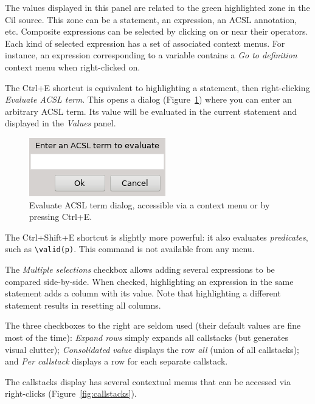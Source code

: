 The values displayed in this panel are related to the green highlighted
zone in the Cil source. This zone can be a statement, an expression,
an ACSL annotation, etc. Composite expressions can be selected by clicking
on or near their operators. Each kind of selected expression has a set
of associated context menus. For instance, an expression corresponding
to a variable contains a \emph{Go to definition} context menu when
right-clicked on.

The Ctrl+E shortcut is equivalent to highlighting a statement, then
right-clicking \emph{Evaluate ACSL term}. This opens a dialog
(Figure~\ref{fig:eval-acsl}) where you can enter an arbitrary ACSL
term. Its value will be evaluated in the current statement and
displayed in the \emph{Values} panel.

\begin{figure}[!hbtp]
\centering
\includegraphics[scale=0.7]{gui-images/eval-acsl.png}
\caption{Evaluate ACSL term dialog, accessible via a context menu or
  by pressing Ctrl+E.}
\label{fig:eval-acsl}
\end{figure}

The Ctrl+Shift+E shortcut is slightly more powerful: it also evaluates
\emph{predicates}, such as \texttt{\textbackslash{}valid(p)}.
This command is not available from any menu.

The \emph{Multiple selections} checkbox allows adding several
expressions to be compared side-by-side. When checked, highlighting an
expression in the same statement adds a column with its value. Note that
highlighting a different statement results in resetting all columns.

The three checkboxes to the right are seldom used (their default values
are fine most of the time): \emph{Expand rows}
simply expands all callstacks (but generates visual clutter);
\emph{Consolidated value} displays the row \emph{all} (union of all
callstacks); and \emph{Per callstack} displays a row for each separate
callstack.

The callstacks display has several contextual menus that can be accessed
via right-clicks (Figure~\ref{fig:callstacks}).

